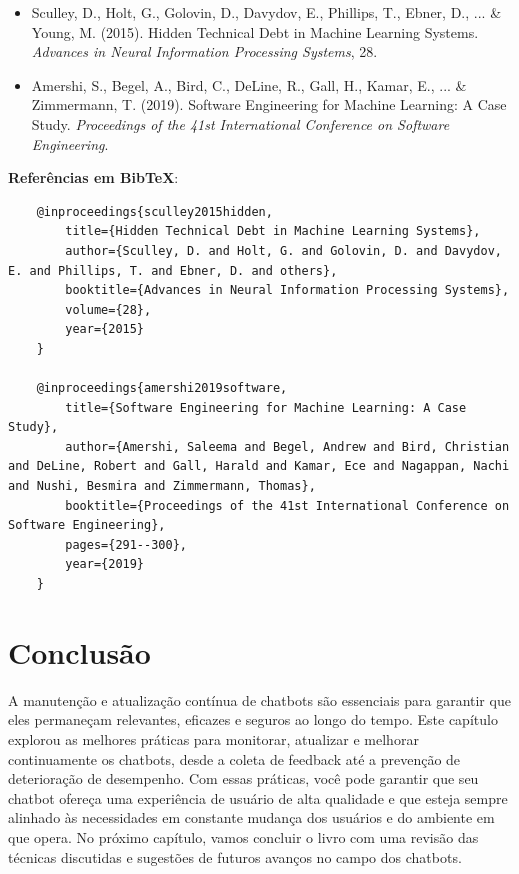 \documentclass[14pt,a4paper,oneside]{book}
\begin{document}
\begin{itemize}
	\item Sculley, D., Holt, G., Golovin, D., Davydov, E., Phillips, T., Ebner, D., ... \& Young, M. (2015). Hidden Technical Debt in Machine Learning Systems. \textit{Advances in Neural Information Processing Systems}, 28.
	\item Amershi, S., Begel, A., Bird, C., DeLine, R., Gall, H., Kamar, E., ... \& Zimmermann, T. (2019). Software Engineering for Machine Learning: A Case Study. \textit{Proceedings of the 41st International Conference on Software Engineering}.
\end{itemize}

\textbf{Referências em BibTeX}:

\begin{verbatim}
	@inproceedings{sculley2015hidden,
		title={Hidden Technical Debt in Machine Learning Systems},
		author={Sculley, D. and Holt, G. and Golovin, D. and Davydov, E. and Phillips, T. and Ebner, D. and others},
		booktitle={Advances in Neural Information Processing Systems},
		volume={28},
		year={2015}
	}
	
	@inproceedings{amershi2019software,
		title={Software Engineering for Machine Learning: A Case Study},
		author={Amershi, Saleema and Begel, Andrew and Bird, Christian and DeLine, Robert and Gall, Harald and Kamar, Ece and Nagappan, Nachi and Nushi, Besmira and Zimmermann, Thomas},
		booktitle={Proceedings of the 41st International Conference on Software Engineering},
		pages={291--300},
		year={2019}
	}
\end{verbatim}

\section{Conclusão}

A manutenção e atualização contínua de chatbots são essenciais para garantir que eles permaneçam relevantes, eficazes e seguros ao longo do tempo. Este capítulo explorou as melhores práticas para monitorar, atualizar e melhorar continuamente os chatbots, desde a coleta de feedback até a prevenção de deterioração de desempenho. Com essas práticas, você pode garantir que seu chatbot ofereça uma experiência de usuário de alta qualidade e que esteja sempre alinhado às necessidades em constante mudança dos usuários e do ambiente em que opera. No próximo capítulo, vamos concluir o livro com uma revisão das técnicas discutidas e sugestões de futuros avanços no campo dos chatbots.
\end{document}
